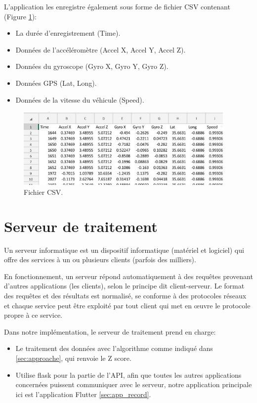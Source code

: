 \begin{itemize}
          

          L'application les enregistre également sous forme de fichier CSV contenant  (Figure \ref{fig:csv}):
          \begin{itemize}
              \item La durée d'enregistrement (Time).
              \item Données de l'accéléromètre (Accel X, Accel Y, Accel Z).
              \item Données du gyroscope (Gyro X, Gyro Y, Gyro Z).
              \item Données GPS (Lat, Long).
              \item Données de la vitesse du véhicule (Speed).
          \end{itemize}
          
\begin{figure}[h!]
        \center
        \includegraphics[width=0.95\textwidth]{Images/recordingApp/csv.jpg}
        \caption{Fichier CSV.}
        \label{fig:csv}
    \end{figure}


\end{itemize}

\newpage

\section{Serveur de traitement}
Un serveur informatique est un dispositif informatique (matériel et logiciel) qui offre des services à un ou plusieurs clients (parfois des milliers).


En fonctionnement, un serveur répond automatiquement à des requêtes provenant d'autres applications (les clients), selon le principe dit client-serveur. Le format des requêtes et des résultats est normalisé, se conforme à des protocoles réseaux et chaque service peut être exploité par tout client qui met en œuvre le protocole propre à ce service.

Dans notre implémentation, le serveur de traitement prend en charge:
\renewcommand{\labelitemi}{$\bullet$}
\begin{itemize}
    \item Le traitement des données avec l'algorithme comme indiqué dans \ref{sec:approache}, qui renvoie le Z score. 
    \item Utilise flask pour la partie de l'API, afin que toutes les autres applications concernées puissent communiquer avec le serveur, notre application principale ici est l'application Flutter \ref{sec:app_record}.
\end{itemize}
